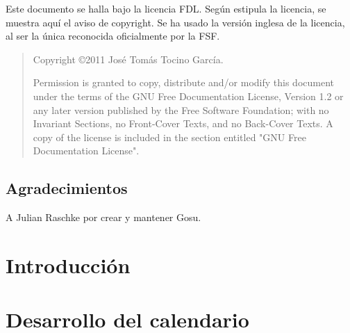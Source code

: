 \documentclass[a4paper,12pt]{scrbook}
\begin{document}




\cleardoublepage



\cleardoublepage
\bigskip
\bigskip

Este documento se halla bajo la licencia \ac{FDL}. Según estipula la
licencia, se muestra aquí el aviso de copyright. Se ha usado la
versión inglesa de la licencia, al ser la única reconocida
oficialmente por la \ac{FSF}.

\begin{quote}
  Copyright \copyright  2011 José Tomás Tocino García.
  
  Permission is granted to copy, distribute and/or modify this document
  under the terms of the GNU Free Documentation License, Version 1.2
  or any later version published by the Free Software Foundation;
  with no Invariant Sections, no Front-Cover Texts, and no Back-Cover Texts.
  A copy of the license is included in the section entitled "GNU
  Free Documentation License".
\end{quote}

\cleardoublepage

\section*{Agradecimientos}

A Julian Raschke por crear y mantener Gosu.

\cleardoublepage

\tableofcontents
\listoffigures

\setlength{\parskip}{1.2ex plus 0.4ex minus 0.1ex}

\chapter{Introducción}
\label{chap:introduccion}


\chapter{Desarrollo del calendario}
\label{chap:calendario}


%
 
\end{document}

